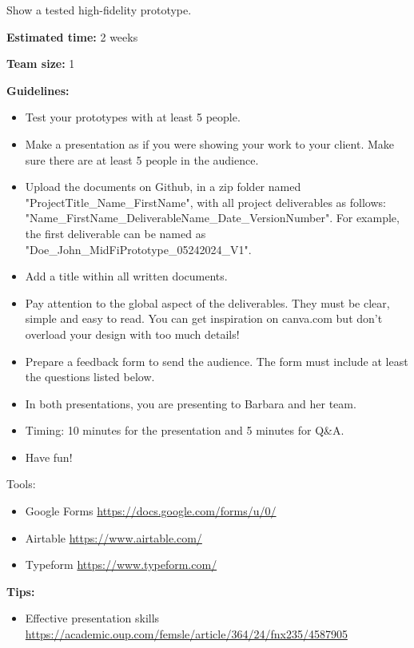 \makeheaderfiles

Show a tested high-fidelity prototype.

\textbf{Estimated time:} 2 weeks

\textbf{Team size:} 1

\textbf{Guidelines:}

\begin{itemize}
\item Test your prototypes with at least 5 people.
\item Make a presentation as if you were showing your work to your client. Make sure there are at least 5 people in the audience.
\item Upload the documents on Github, in a zip folder named "ProjectTitle\_Name\_FirstName", with all project deliverables as follows: "Name\_FirstName\_DeliverableName\_Date\_VersionNumber".  For example, the first deliverable can be named as "Doe\_John\_MidFiPrototype\_05242024\_V1".
\item Add a title within all written documents.
\item Pay attention to the global aspect of the deliverables. They must be clear, simple and easy to read. You can get inspiration on canva.com but don't overload your design with too much details!
\item Prepare a feedback form to send the audience. The form must include at least the questions listed below.
\item In both presentations, you are presenting to Barbara and her team.
\item Timing: 10 minutes for the presentation and 5 minutes for Q\&A.
\item Have fun!
\end{itemize}

Tools:

\begin{itemize}
\item Google Forms \url{https://docs.google.com/forms/u/0/}
\item Airtable \url{https://www.airtable.com/}
\item Typeform \url{https://www.typeform.com/}
\end{itemize}

\textbf{Tips:}

\begin{itemize}
\item Effective presentation skills \url{https://academic.oup.com/femsle/article/364/24/fnx235/4587905}
\end{itemize}

